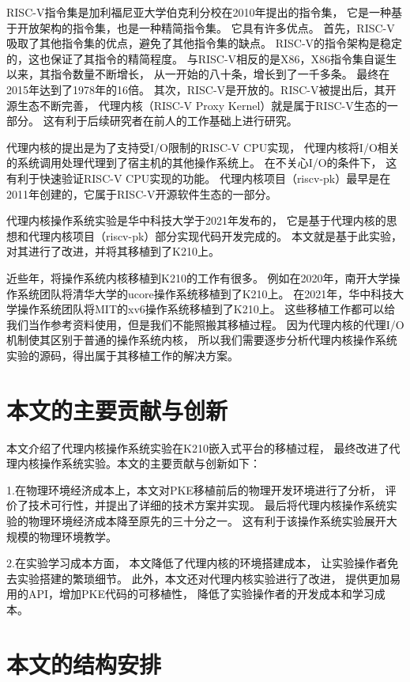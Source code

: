RISC-V指令集是加利福尼亚大学伯克利分校在2010年提出的指令集，
它是一种基于开放架构的指令集，也是一种精简指令集。\cite{雷思磊2017RISC}
它具有许多优点。
首先，RISC-V吸取了其他指令集的优点，避免了其他指令集的缺点。
RISC-V的指令架构是稳定的，这也保证了其指令的精简程度。
与RISC-V相反的是X86，X86指令集自诞生以来，其指令数量不断增长，
从一开始的八十条，增长到了一千多条。
最终在2015年达到了1978年的16倍。
其次，RISC-V是开放的。RISC-V被提出后，其开源生态不断完善，
代理内核（RISC-V Proxy Kernel）就是属于RISC-V生态的一部分。
这有利于后续研究者在前人的工作基础上进行研究。\cite{胡振波2019RISC}

代理内核的提出是为了支持受I/O限制的RISC-V CPU实现，
代理内核将I/O相关的系统调用处理代理到了宿主机的其他操作系统上。
在不关心I/O的条件下，
这有利于快速验证RISC-V CPU实现的功能。
代理内核项目（riscv-pk）最早是在2011年创建的，它属于RISC-V开源软件生态的一部分。

代理内核操作系统实验是华中科技大学于2021年发布的，
它是基于代理内核的思想和代理内核项目（riscv-pk）部分实现代码开发完成的。
本文就是基于此实验，对其进行了改进，并将其移植到了K210上。

近些年，将操作系统内核移植到K210的工作有很多。\cite{孙卫真2021基于}
例如在2020年，南开大学操作系统团队将清华大学的ucore操作系统移植到了K210上。
在2021年，华中科技大学操作系统团队将MIT的xv6操作系统移植到了K210上。
这些移植工作都可以给我们当作参考资料使用，但是我们不能照搬其移植过程。
因为代理内核的代理I/O机制使其区别于普通的操作系统内核，
所以我们需要逐步分析代理内核操作系统实验的源码，得出属于其移植工作的解决方案。



\section{本文的主要贡献与创新}

本文介绍了代理内核操作系统实验在K210嵌入式平台的移植过程，
最终改进了代理内核操作系统实验。本文的主要贡献与创新如下：

1.在物理环境经济成本上，本文对PKE移植前后的物理开发环境进行了分析，
评价了技术可行性，并提出了详细的技术方案并实现。
最后将代理内核操作系统实验的物理环境经济成本降至原先的三十分之一。
这有利于该操作系统实验展开大规模的物理环境教学。

2.在实验学习成本方面，
本文降低了代理内核的环境搭建成本，
让实验操作者免去实验搭建的繁琐细节。
此外，本文还对代理内核实验进行了改进，
提供更加易用的API，增加PKE代码的可移植性，
降低了实验操作者的开发成本和学习成本。

\section{本文的结构安排}

